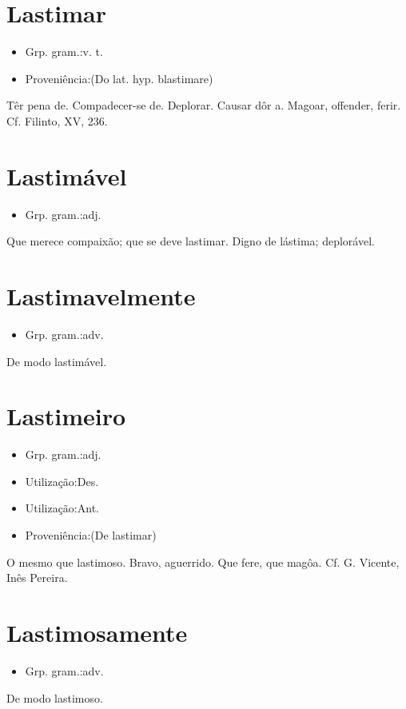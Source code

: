 \section{Lastimar}
\begin{itemize}
\item {Grp. gram.:v. t.}
\end{itemize}
\begin{itemize}
\item {Proveniência:(Do lat. hyp. \textunderscore blastimare\textunderscore )}
\end{itemize}
Têr pena de.
Compadecer-se de.
Deplorar.
Causar dôr a.
Magoar, offender, ferir. Cf. Filinto, XV, 236.
\section{Lastimável}
\begin{itemize}
\item {Grp. gram.:adj.}
\end{itemize}
Que merece compaixão; que se deve lastimar.
Digno de lástima; deplorável.
\section{Lastimavelmente}
\begin{itemize}
\item {Grp. gram.:adv.}
\end{itemize}
De modo lastimável.
\section{Lastimeiro}
\begin{itemize}
\item {Grp. gram.:adj.}
\end{itemize}
\begin{itemize}
\item {Utilização:Des.}
\end{itemize}
\begin{itemize}
\item {Utilização:Ant.}
\end{itemize}
\begin{itemize}
\item {Proveniência:(De \textunderscore lastimar\textunderscore )}
\end{itemize}
O mesmo que \textunderscore lastimoso\textunderscore .
Bravo, aguerrido.
Que fere, que magôa. Cf. G. Vicente, \textunderscore Inês Pereira\textunderscore .
\section{Lastimosamente}
\begin{itemize}
\item {Grp. gram.:adv.}
\end{itemize}
De modo lastimoso.
